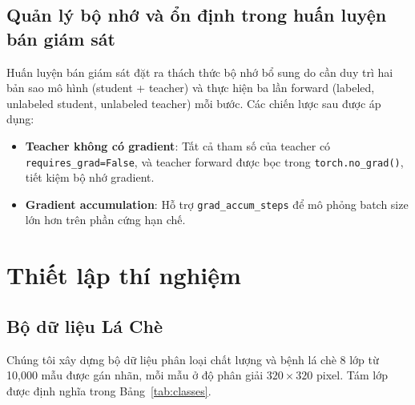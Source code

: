 \documentclass[conference]{IEEEtran}
\begin{document}
\subsection{Quản lý bộ nhớ và ổn định trong huấn luyện bán giám sát}

Huấn luyện bán giám sát đặt ra thách thức bộ nhớ bổ sung do cần duy trì hai bản sao mô hình (student + teacher) và thực hiện ba lần forward (labeled, unlabeled student, unlabeled teacher) mỗi bước. Các chiến lược sau được áp dụng:

\begin{itemize}
    \item \textbf{Teacher không có gradient}: Tất cả tham số của teacher có \texttt{requires\_grad=False}, và teacher forward được bọc trong \texttt{torch.no\_grad()}, tiết kiệm bộ nhớ gradient.
    \item \textbf{Gradient accumulation}: Hỗ trợ \texttt{grad\_accum\_steps} để mô phỏng batch size lớn hơn trên phần cứng hạn chế.
\end{itemize}


\section{Thiết lập thí nghiệm}

\subsection{Bộ dữ liệu Lá Chè}

Chúng tôi xây dựng bộ dữ liệu phân loại chất lượng và bệnh lá chè 8 lớp từ 10,000 mẫu được gán nhãn, mỗi mẫu ở độ phân giải $320 \times 320$ pixel. Tám lớp được định nghĩa trong Bảng~\ref{tab:classes}.

\begin{table}[t]
\centering
\caption{Định nghĩa các lớp phân loại lá chè}
\label{tab:classes}
\end{table}
\end{document}
